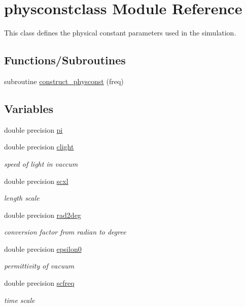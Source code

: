 \hypertarget{namespacephysconstclass}{}\section{physconstclass Module Reference}
\label{namespacephysconstclass}


This class defines the physical constant parameters used in the simulation.  


\subsection*{Functions/\+Subroutines}
\begin{DoxyCompactItemize}
\item 
subroutine \mbox{\hyperlink{namespacephysconstclass_ad68ae2acfa376befa6478a8b40a80168}{construct\+\_\+physconst}} (freq)
\end{DoxyCompactItemize}
\subsection*{Variables}
\begin{DoxyCompactItemize}
\item 
double precision \mbox{\hyperlink{namespacephysconstclass_a78e5b579cf4c062c45ae0f9922355783}{pi}}
\item 
double precision \mbox{\hyperlink{namespacephysconstclass_a8622c3bd03bb3706b061386b694c8f71}{clight}}
\begin{DoxyCompactList}\small\item\em speed of light in vaccum \end{DoxyCompactList}\item 
double precision \mbox{\hyperlink{namespacephysconstclass_af2c99b666d1986d824837a37dd85cd50}{scxl}}
\begin{DoxyCompactList}\small\item\em length scale \end{DoxyCompactList}\item 
double precision \mbox{\hyperlink{namespacephysconstclass_a1f59be9127e8be0b50b2f15277976fb2}{rad2deg}}
\begin{DoxyCompactList}\small\item\em conversion factor from radian to degree \end{DoxyCompactList}\item 
double precision \mbox{\hyperlink{namespacephysconstclass_affe5679370336ffdace4ff9f095211f9}{epsilon0}}
\begin{DoxyCompactList}\small\item\em permittivity of vacuum \end{DoxyCompactList}\item 
double precision \mbox{\hyperlink{namespacephysconstclass_a72551429ee6cdefac23bdaafc09bb169}{scfreq}}
\begin{DoxyCompactList}\small\item\em time scale \end{DoxyCompactList}\end{DoxyCompactItemize}


